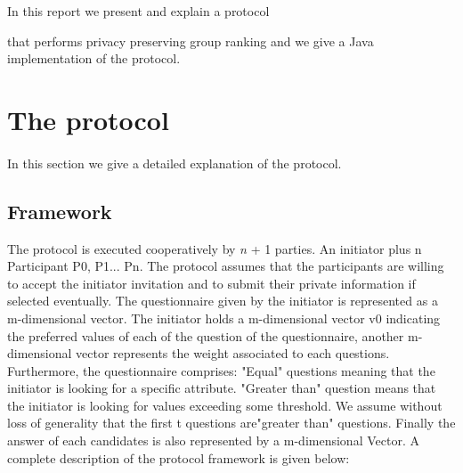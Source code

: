 \documentclass[11pt, a4paper, twoside, openright]{book} %
\begin{document}
In this report we present and explain a protocol

that performs privacy preserving group ranking and we give a Java implementation of the protocol.

\newpage

\section{The protocol}

\paragraph{}
In this section we give a detailed explanation of the protocol. 

\subsection{Framework}
 The protocol is executed cooperatively by  \textit{n} + 1 parties. An initiator plus n Participant P0, P1... Pn. The protocol assumes that the participants are willing to accept the initiator invitation and to submit their private information if selected eventually.
The questionnaire given by the initiator is represented as a m-dimensional vector. The initiator holds a m-dimensional vector v0 indicating the preferred values of each of the question of the questionnaire, another m-dimensional vector represents the weight associated to each questions. Furthermore, the questionnaire comprises: "Equal" questions meaning that the initiator is looking for a specific attribute. "Greater than" question means that the initiator is looking for values exceeding some threshold. We assume without loss of generality that the first t questions are"greater than" questions. Finally the answer of each candidates is also represented by a m-dimensional Vector. A complete description of the protocol framework is given below:
\end{document}
